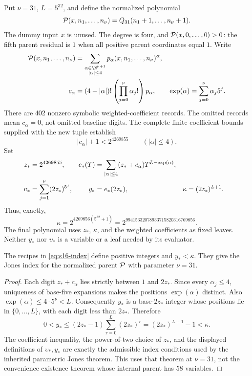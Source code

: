 Put \(\nu=31\), \(L=5^{32}\), and define the normalized polynomial
\[
 {\cal P}(x,n_1,\ldots,n_\nu)
       =Q_{31}(n_1+1,\ldots,n_\nu+1).
\]
The dummy input \(x\) is unused.  The degree is four, and
\({\cal P}(x,0,\ldots,0)>0\): the fifth parent residual is \(1\) when all
positive parent coordinates equal \(1\).
Write
\begin{align*}
 {\cal P}(x,n_1,\ldots,n_\nu)
    &=\sum_{\substack{\alpha\in\N^{\nu+1}\\|\alpha|\leq4}}
       p_\alpha (x,n_1,\ldots,n_\nu)^\alpha,\\
 c_\alpha&=(4-|\alpha|)!\left(\prod_{j=0}^{\nu}\alpha_j!\right)p_\alpha,
 \qquad
 \operatorname{exp}(\alpha)=\sum_{j=0}^{\nu}\alpha_j5^j .
\end{align*}
There are 402 nonzero symbolic weighted-coefficient records.  The omitted
records mean \(c_\alpha=0\), not omitted baseline digits.  The complete
finite coefficient bounds supplied with the new tuple establish
\[
 |c_\alpha|+1<2^{4269855}\qquad (|\alpha|\leq4).
\]
Set
\begin{align}
 z_*&=2^{4269855},&
 e_*(T)&=\sum_{|\alpha|\leq4}
        (z_*+c_\alpha)T^{L-\operatorname{exp}(\alpha)},\notag\\
 \upsilon_*&=\sum_{j=1}^{\nu}(2z_*)^{5^j},&
 y_*&=e_*(2z_*),&
 \kappa&=(2z_*)^{L+1}.
 \label{eq:s16-index}
\end{align}
Thus, exactly,
\[
 \kappa
 =2^{4269856(5^{32}+1)}
 =2^{99415332078933715820316769856}.
\]
The final polynomial uses \(z_*\), \(\kappa\), and the weighted coefficients
as fixed leaves.  Neither \(y_*\) nor \(\upsilon_*\) is a variable or a leaf
needed by its evaluator.

\begin{lemma}\label{lem:s16-kappa}
The recipes in \eqref{eq:s16-index} define positive integers and
\(y_*<\kappa\).  They give the Jones index for the normalized parent
\({\cal P}\) with parameter \(\nu=31\).
\end{lemma}
\begin{proof}
Each digit \(z_*+c_\alpha\) lies strictly between \(1\) and \(2z_*\).
Since every \(\alpha_j\leq4\), uniqueness of base-five expansions makes
the positions \(\operatorname{exp}(\alpha)\) distinct.  Also
\(\operatorname{exp}(\alpha)\leq4\cdot5^\nu<L\).
Consequently \(y_*\) is a base-\(2z_*\) integer whose positions lie in
\(\{0,\ldots,L\}\), with each digit less than \(2z_*\).  Therefore
\[
 0<y_*
 \leq(2z_*-1)\sum_{r=0}^{L}(2z_*)^r
 =(2z_*)^{L+1}-1<\kappa.
\]
The coefficient inequality, the power-of-two choice of \(z_*\), and the
displayed definitions of \(\upsilon_*,y_*\) are exactly the admissible
index conditions used by the inherited parametric Jones theorem.  This
uses that theorem at \(\nu=31\), not the convenience existence theorem
whose internal parent has 58 variables.
\end{proof}

